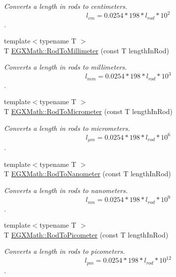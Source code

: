 \begin{DoxyCompactItemize}
\begin{DoxyCompactList}\small\item\em Converts a length in rods to centimeters. \[ l_{cm}=0.0254 * 198 * l_{rod} * 10^{2} \]. \end{DoxyCompactList}\item 
{\footnotesize template$<$typename T $>$ }\\T \mbox{\hyperlink{group___e_g_x_math-_conversions-_length_conversions-_surveyors-_rod-_s_i_gac99fbcf597375add3d57bcf16d64a890}{E\+G\+X\+Math\+::\+Rod\+To\+Millimeter}} (const T length\+In\+Rod)
\begin{DoxyCompactList}\small\item\em Converts a length in rods to millimeters. \[ l_{mm}=0.0254 * 198 * l_{rod} * 10^{3} \]. \end{DoxyCompactList}\item 
{\footnotesize template$<$typename T $>$ }\\T \mbox{\hyperlink{group___e_g_x_math-_conversions-_length_conversions-_surveyors-_rod-_s_i_ga8821e67ddd408e4b4b9c4d1512b6a9d8}{E\+G\+X\+Math\+::\+Rod\+To\+Micrometer}} (const T length\+In\+Rod)
\begin{DoxyCompactList}\small\item\em Converts a length in rods to micrometers. \[ l_{\mu m}=0.0254 * 198 * l_{rod} * 10^{6} \]. \end{DoxyCompactList}\item 
{\footnotesize template$<$typename T $>$ }\\T \mbox{\hyperlink{group___e_g_x_math-_conversions-_length_conversions-_surveyors-_rod-_s_i_gaa41557dd8cc5aa5ff83312665e8a4331}{E\+G\+X\+Math\+::\+Rod\+To\+Nanometer}} (const T length\+In\+Rod)
\begin{DoxyCompactList}\small\item\em Converts a length in rods to nanometers. \[ l_{nm}=0.0254 * 198 * l_{rod} * 10^{9} \]. \end{DoxyCompactList}\item 
{\footnotesize template$<$typename T $>$ }\\T \mbox{\hyperlink{group___e_g_x_math-_conversions-_length_conversions-_surveyors-_rod-_s_i_ga212e66c6922a0df85714ec8559af8790}{E\+G\+X\+Math\+::\+Rod\+To\+Picometer}} (const T length\+In\+Rod)
\begin{DoxyCompactList}\small\item\em Converts a length in rods to picometers. \[ l_{pm}=0.0254 * 198 * l_{rod} * 10^{12} \]. \end{DoxyCompactList}\item 

\end{DoxyCompactItemize}
